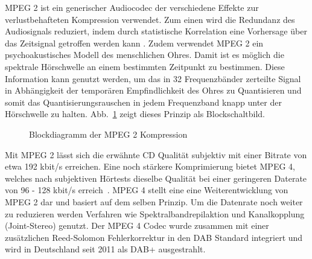 \ac{MPEG 2} ist ein generischer Audiocodec der verschiedene Effekte zur verlustbehafteten Kompression verwendet. Zum einen wird die Redundanz des Audiosignals reduziert, indem durch statistische Korrelation eine Vorhersage über das Zeitsignal getroffen werden kann \cite{dab_buch}. Zudem verwendet \ac{MPEG 2} ein psychoakustisches Modell des menschlichen Ohres. Damit ist es möglich die spektrale Hörschwelle an einem bestimmten Zeitpunkt zu bestimmen. Diese Information kann genutzt werden, um das in 32 Frequenzbänder zerteilte Signal in Abhängigkeit der temporären Empfindlichkeit des Ohres zu Quantisieren und somit das Quantisierungsrauschen in jedem Frequenzband knapp unter der Hörschwelle zu halten. Abb.~\ref{chart:MPEG} zeigt dieses Prinzip als Blockschaltbild. 
\\
\begin{figure} [h]
\begin{center}
\caption{Blockdiagramm der MPEG 2 Kompression}
\label{chart:MPEG}
\end{center}
\end{figure}

Mit \ac{MPEG 2} lässt sich die erwähnte CD Qualität subjektiv mit einer Bitrate von etwa 192 kbit/s erreichen. Eine noch stärkere Komprimierung bietet \ac{MPEG 4}, welches nach subjektiven Hörtests dieselbe Qualität bei einer geringeren Daterate von 96 - 128 kbit/s erreich~\cite{mpeg:audio_tests}. \ac{MPEG 4} stellt eine eine Weiterentwicklung von \ac{MPEG 2} dar und basiert auf dem selben Prinzip. Um die Datenrate noch weiter zu reduzieren werden Verfahren wie Spektralbandrepilaktion und Kanalkopplung (Joint-Stereo) genutzt. Der \ac{MPEG 4} Codec wurde zusammen mit einer zusätzlichen Reed-Solomon Fehlerkorrektur in den DAB Standard integriert und wird in Deutschland seit 2011 als DAB+ ausgestrahlt. 

